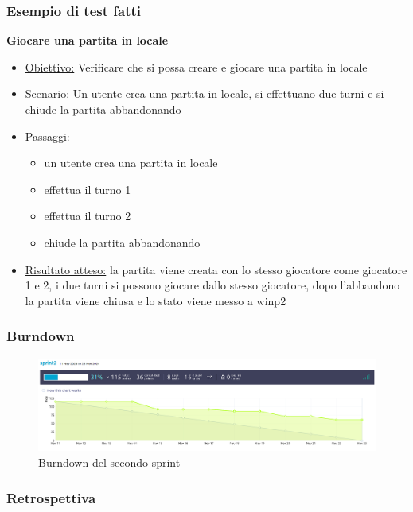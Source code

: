 \documentclass{article}
\begin{document}
\subsubsection{Esempio di test fatti}

\textbf{Giocare una partita in locale}
\begin{itemize}
    \item \underline{Obiettivo:} Verificare che si possa creare e giocare una partita in locale
    \item \underline{Scenario:} Un utente crea una partita in locale, si effettuano due turni e si chiude la partita abbandonando
    \item \underline{Passaggi:}
    \begin{itemize}
        \item un utente crea una partita in locale
        \item effettua il turno 1
        \item effettua il turno 2
        \item chiude la partita abbandonando
        \end{itemize}
    \item \underline{Risultato atteso:} la partita viene creata con lo stesso giocatore come giocatore 1 e 2, i due turni si possono giocare 
    dallo stesso giocatore, dopo l'abbandono la partita viene chiusa e lo stato viene messo a winp2
\end{itemize}

\subsubsection{Burndown}
\begin{figure}[H]
    \centering
    \includegraphics[width=1\textwidth]{burndown2}
    \caption{Burndown del secondo sprint}
    \label{fig:burndown2}
\end{figure}

\subsubsection{Retrospettiva}
\end{document}
